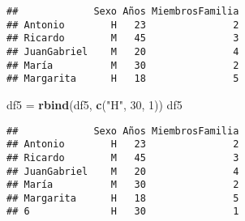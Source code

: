 \documentclass[
]{article}
\newenvironment{Shaded}{\begin{snugshade}}{\end{snugshade}}
\newcommand{\DataTypeTok}[1]{\textcolor[rgb]{0.13,0.29,0.53}{#1}}
\newcommand{\DecValTok}[1]{\textcolor[rgb]{0.00,0.00,0.81}{#1}}
\newcommand{\KeywordTok}[1]{\textcolor[rgb]{0.13,0.29,0.53}{\textbf{#1}}}
\newcommand{\NormalTok}[1]{#1}
\newcommand{\OperatorTok}[1]{\textcolor[rgb]{0.81,0.36,0.00}{\textbf{#1}}}
\newcommand{\OtherTok}[1]{\textcolor[rgb]{0.56,0.35,0.01}{#1}}
\newcommand{\StringTok}[1]{\textcolor[rgb]{0.31,0.60,0.02}{#1}}
\begin{document}
\begin{verbatim}
##             Sexo Años MiembrosFamilia
## Antonio        H   23               2
## Ricardo        M   45               3
## JuanGabriel    M   20               4
## María          M   30               2
## Margarita      H   18               5
\end{verbatim}

\begin{Shaded}
\begin{Highlighting}[]
\NormalTok{df5 =}\StringTok{ }\KeywordTok{rbind}\NormalTok{(df5, }\KeywordTok{c}\NormalTok{(}\StringTok{"H"}\NormalTok{, }\DecValTok{30}\NormalTok{, }\DecValTok{1}\NormalTok{))}
\NormalTok{df5}
\end{Highlighting}
\end{Shaded}

\begin{verbatim}
##             Sexo Años MiembrosFamilia
## Antonio        H   23               2
## Ricardo        M   45               3
## JuanGabriel    M   20               4
## María          M   30               2
## Margarita      H   18               5
## 6              H   30               1
\end{verbatim}

\begin{Shaded}
\end{Shaded}

\begin{Shaded}
\end{Shaded}
\end{document}
